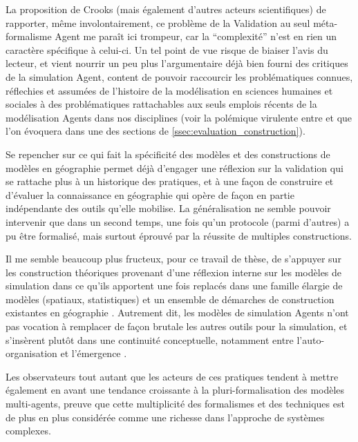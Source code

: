 La proposition de Crooks (mais également d'autres acteurs scientifiques) de rapporter, même involontairement, ce problème de la Validation au seul méta-formalisme Agent me paraît ici trompeur, car la \enquote{complexité} n'est en rien un caractère spécifique à celui-ci. Un tel point de vue risque de biaiser l'avis du lecteur, et vient nourrir un peu plus l'argumentaire déjà bien fourni des critiques de la simulation Agent, content de pouvoir raccourcir les problématiques connues, réflechies et assumées de l'histoire de la modélisation en sciences humaines et sociales à des problématiques rattachables aux seuls emplois récents de la modélisation Agents dans nos disciplines (voir la polémique virulente entre \textcite{Yanoff2008} et \textcites{Elsenbroich2012,Chattoe2011} que l'on évoquera dans une des sections de \ref{ssec:evaluation_construction}).

Se repencher sur ce qui fait la spécificité des modèles et des constructions de modèles en géographie permet déjà d'engager une réflexion sur la validation qui se rattache plus à un historique des pratiques, et à une façon de construire et d'évaluer la connaissance en géographie qui opère de façon en partie indépendante des outils qu'elle mobilise. La généralisation ne semble pouvoir intervenir que dans un second temps, une fois qu'un protocole (parmi d'autres) a pu être formalisé, mais surtout éprouvé par la réussite de multiples constructions. %

Il me semble beaucoup plus fructeux, pour ce travail de thèse, de s'appuyer sur les construction théoriques provenant d'une réflexion interne sur les modèles de simulation dans ce qu'ils apportent une fois replacés dans une famille élargie de modèles (spatiaux, statistiques) et un ensemble de démarches de construction existantes en géographie \autocites{Geopoint2000, Mathian2014, Sanders2007}. Autrement dit, les modèles de simulation Agents n'ont pas vocation à remplacer de façon brutale les autres outils pour la simulation, et s'insèrent plutôt dans une continuité conceptuelle, notamment entre l'auto-organisation et l'émergence \autocites{Pumain2013}[851]{Sanders2013}.

Les observateurs \autocites{Varenne2008b,Varenne2012a} tout autant que les acteurs \autocite{Sanders2013} de ces pratiques tendent à mettre également en avant une tendance croissante à la pluri-formalisation des modèles multi-agents, preuve que cette multiplicité des formalismes et des techniques est de plus en plus considérée comme une richesse dans l'approche de systèmes complexes.


